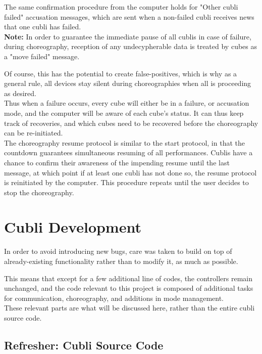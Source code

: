 \begin{itemize}
The same confirmation procedure from the computer holds for "Other cubli failed" accusation messages, which are sent when a non-failed cubli receives news that one cubli has failed.\\

\textbf{Note:} In order to guarantee the immediate pause of all cublis in case of failure, during choreography, reception of any undecypherable data is treated by cubes as a "move failed" message.

Of course, this has the potential to create false-positives, which is why as a general rule, all devices stay silent during choreographies when all is proceeding as desired.\\

Thus when a failure occurs, every cube will either be in a failure, or accusation mode, and the computer will be aware of each cube's status. It can thus keep track of recoveries, and which cubes need to be recovered before the choreography can be re-initiated.\\

The choreography resume protocol is similar to the start protocol, in that the countdown guarantees simultaneous resuming of all performances. Cublis have a chance to confirm their awareness of the impending resume until the last message, at which point if at least one cubli has not done so, the resume protocol is reinitiated by the computer. This procedure repeats until the user decides to stop the choreography.




\end{itemize}

\section{Cubli Development}

In order to avoid introducing new bugs, care was taken to build on top of already-existing functionality rather than to modify it, as much as possible.

This means that except for a few additional line of codes, the controllers remain unchanged, and the code relevant to this project is composed of additional tasks for communication, choreography, and additions in mode management.\\

These relevant parts are what will be discussed here, rather than the entire cubli source code.

\subsection{Refresher: Cubli Source Code }

